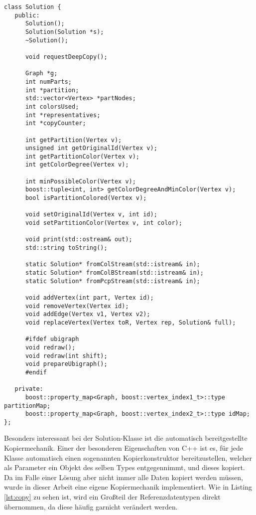 \singlespacing
\lstset{style=customc}
\begin{lstlisting}[caption={Signatur der Solutionklasse},label=lst:solution]
class Solution {
   public:
      Solution();
      Solution(Solution *s);
      ~Solution();
      
      void requestDeepCopy();

      Graph *g;
      int numParts;
      int *partition;
      std::vector<Vertex> *partNodes;
      int colorsUsed;
      int *representatives;
      int *copyCounter;
      
      int getPartition(Vertex v);
      unsigned int getOriginalId(Vertex v);
      int getPartitionColor(Vertex v);
      int getColorDegree(Vertex v);
      
      int minPossibleColor(Vertex v);
      boost::tuple<int, int> getColorDegreeAndMinColor(Vertex v);
      bool isPartitionColored(Vertex v);
      
      void setOriginalId(Vertex v, int id);
      void setPartitionColor(Vertex v, int color);
      
      void print(std::ostream& out);
      std::string toString();
      
      static Solution* fromColStream(std::istream& in);
      static Solution* fromColBStream(std::istream& in);
      static Solution* fromPcpStream(std::istream& in);
      
      void addVertex(int part, Vertex id);
      void removeVertex(Vertex id);
      void addEdge(Vertex v1, Vertex v2);
      void replaceVertex(Vertex toR, Vertex rep, Solution& full);
      
      #ifdef ubigraph
      void redraw();
      void redraw(int shift);
      void prepareUbigraph();
      #endif
      
   private:
      boost::property_map<Graph, boost::vertex_index1_t>::type partitionMap;
      boost::property_map<Graph, boost::vertex_index2_t>::type idMap;
};
\end{lstlisting}

Besonders interessant bei der Solution-Klasse ist die automatisch bereitgestellte Kopiermechanik. Einer der besonderen Eigenschaften von C++ ist es, für jede Klasse automatisch einen sogenannten Kopierkonstruktor
bereitzustellen, welcher als Parameter ein Objekt des selben Types entgegennimmt, und dieses kopiert. Da im Falle einer Lösung aber nicht immer alle Daten kopiert werden müssen, wurde in dieser Arbeit eine
eigene Kopiermechanik implementiert. Wie in Listing \ref{lst:copy} zu sehen ist, wird ein Großteil der Referenzdatentypen direkt übernommen, da diese häufig garnicht verändert werden. 

